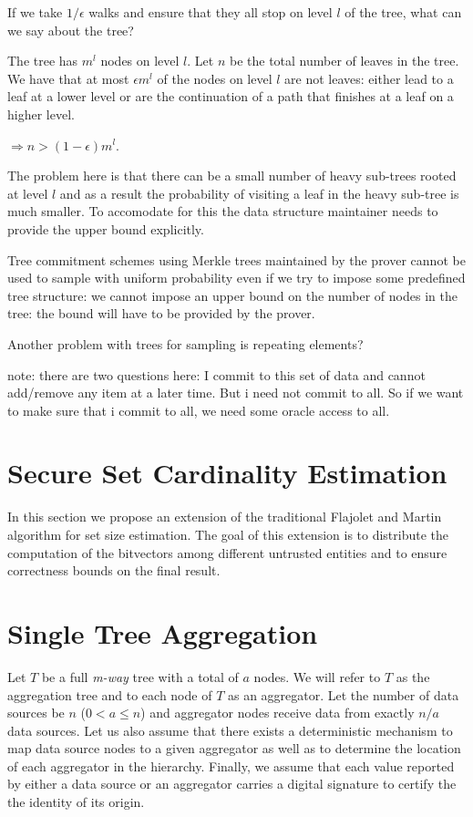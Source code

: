 \documentclass{article}
\begin{document}
If we take $1/\epsilon$ walks and ensure that they all stop on level
$l$ of the tree, what can we say about the tree?

The tree has $m^l$ nodes on level $l$. Let $n$ be the total number of
leaves in the tree. We have that at most $\epsilon m^l$ of the nodes
on level $l$ are not leaves: either lead to a leaf at a lower level or are the
continuation of a path that finishes at a leaf on a higher level.

$\Rightarrow n > (1-\epsilon)m^l$.

The problem here is that there can be a small number of heavy
sub-trees rooted at level $l$ and as a result the probability of
visiting a leaf in the heavy sub-tree is much smaller. To accomodate
for this the data structure maintainer needs to provide the upper
bound explicitly.

Tree commitment schemes using Merkle trees maintained by the prover
cannot be used to sample with uniform probability even if we try to
impose some predefined tree structure: we cannot impose an upper bound on the
number of nodes in the tree: the bound will have to be provided by the
prover.

Another problem with trees for sampling is repeating elements? 



note: there are two questions here: I commit to this set of data and
cannot add/remove any item at a later time. But i need not commit to
all. So if we want to make sure that i commit to all, we need some
oracle access to all.





\section{Secure Set Cardinality Estimation}
In this section we propose an extension of the traditional Flajolet
and Martin algorithm for set size estimation. The goal of this
extension is to distribute the computation of the bitvectors among
different untrusted entities and to ensure correctness bounds on the
final result.






\section{Single Tree Aggregation}
\label{sec:aggregation}
Let $T$ be a full \emph{m-way} tree with a total
of $a$ nodes. We will refer to $T$ as the aggregation tree and to each
node of $T$ as an aggregator. Let the number of data sources be $n$
($0 < a \leq n$) and aggregator nodes receive data from exactly $n/a$
data sources. Let us also assume that there exists
a deterministic mechanism to map data source nodes to a given
aggregator as well as to determine the location of each aggregator in
the hierarchy. Finally, we assume that each value reported by either a
data source or an aggregator carries a digital signature to certify
the the identity of its origin. 
\end{document}

